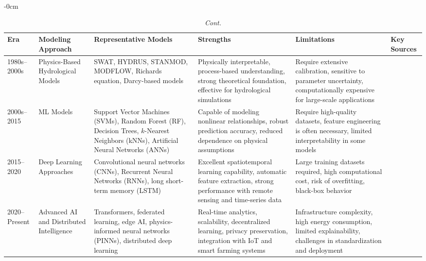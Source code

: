 \documentclass[land,review,accept,pdftex,oneauthor]{Definitions/mdpi}
\begin{document}
\begin{table}[H]\ContinuedFloat
\small
\caption{{\em Cont.}}


\small
\renewcommand{\arraystretch}{1.2}

\begin{adjustwidth}{-\extralength}{0cm}
\begin{minipage}{\fulllength}
\begin{tabularx}{\textwidth}{m{2.2cm}<{\raggedright}m{2.6cm}<{\raggedright}m{3.3cm}<{\raggedright}m{3.4cm}<{\raggedright}m{3.3cm}<{\raggedright}m{1.2cm}<{\raggedright}}
\toprule
Era & Modeling Approach & Representative Models & Strengths & Limitations & Key Sources \\
\midrule


1980s--2000s &
Physics-Based Hydrological Models &
SWAT, HYDRUS, STANMOD, MODFLOW, Richards equation, Darcy-based models &
Physically interpretable, process-based understanding, strong theoretical foundation, effective for hydrological simulations &
Require extensive calibration, sensitive to parameter uncertainty, computationally expensive for large-scale applications &
\citep{Arnold1998,Simunek,Harbaugh2005,Richards1931} \\ 
\midrule

2000s--2015 &
ML Models &
Support Vector Machines (SVMs), Random Forest (RF), Decision Trees, {$k$-Nearest Neighbors (kNNs)}, Artificial Neural Networks (ANNs) &
Capable of modeling nonlinear relationships, robust prediction accuracy, reduced dependence on physical assumptions &
Require high-quality datasets, feature engineering is often necessary, limited interpretability in some models &
\citep{Breiman2001,Maier2000,Elshorbagy2010} \\ 
\midrule

2015--2020 &
Deep Learning Approaches &
Convolutional neural networks (CNNs), Recurrent Neural Networks (RNNs), long short-term memory (LSTM) &
Excellent spatiotemporal learning capability, automatic feature extraction, strong performance with remote sensing and time-series data &
Large training datasets required, high computational cost, risk of overfitting, black-box behavior &
\citep{Kratzert2018,Reichstein2019,Shen2018} \\ 
\midrule

2020--Present &
Advanced AI and Distributed Intelligence &
Transformers, federated learning, edge AI, physics-informed neural networks (PINNs), distributed deep learning &
Real-time analytics, scalability, decentralized learning, privacy preservation, integration with IoT and smart farming systems &
Infrastructure complexity, high energy consumption, limited explainability, challenges in standardization and deployment &
\citep{Karniadakis2021,Lai} \\
\midrule


\end{tabularx}
\end{minipage}
\end{adjustwidth}
\end{table}
\end{document}
